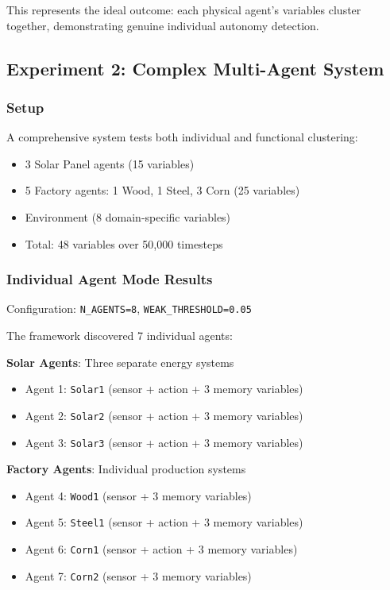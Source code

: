 \documentclass[10pt,conference]{IEEEtran}
\begin{document}
This represents the ideal outcome: each physical agent's variables cluster together, demonstrating genuine individual autonomy detection.

\subsection{Experiment 2: Complex Multi-Agent System}

\subsubsection{Setup}
A comprehensive system tests both individual and functional clustering:
\begin{itemize}
  \item 3 Solar Panel agents (15 variables)
  \item 5 Factory agents: 1 Wood, 1 Steel, 3 Corn (25 variables)
  \item Environment (8 domain-specific variables)
  \item Total: 48 variables over 50,000 timesteps
\end{itemize}

\subsubsection{Individual Agent Mode Results}
Configuration: \texttt{N\_AGENTS=8}, \texttt{WEAK\_THRESHOLD=0.05}

The framework discovered 7 individual agents:

\textbf{Solar Agents}: Three separate energy systems
\begin{itemize}
  \item Agent 1: \texttt{Solar1} (sensor + action + 3 memory variables)
  \item Agent 2: \texttt{Solar2} (sensor + action + 3 memory variables)  
  \item Agent 3: \texttt{Solar3} (sensor + action + 3 memory variables)
\end{itemize}

\textbf{Factory Agents}: Individual production systems
\begin{itemize}
  \item Agent 4: \texttt{Wood1} (sensor + 3 memory variables)
  \item Agent 5: \texttt{Steel1} (sensor + action + 3 memory variables)
  \item Agent 6: \texttt{Corn1} (sensor + action + 3 memory variables)
  \item Agent 7: \texttt{Corn2} (sensor + 3 memory variables)
\end{itemize}
\end{document}
